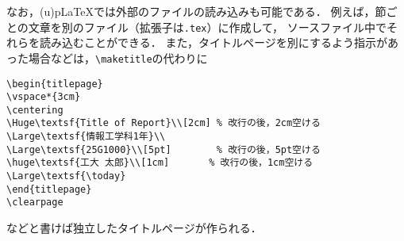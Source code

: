 なお，(u){p\LaTeX}では外部のファイルの読み込みも可能である．
例えば，節ごとの文章を別のファイル（拡張子は\texttt{.tex}）に作成して，
ソースファイル中でそれらを読み込むことができる．
また，タイトルページを別にするよう指示があった場合などは，\verb|\maketitle|の代わりに
\begin{tcolorbox}[colback=blue!5!white,colframe=blue!70!black,breakable=true]
\begin{lstlisting}
\begin{titlepage}
\vspace*{3cm}
\centering
\Huge\textsf{Title of Report}\\[2cm] % 改行の後，2cm空ける
\Large\textsf{情報工学科1年}\\
\Large\textsf{25G1000}\\[5pt]        % 改行の後，5pt空ける
\huge\textsf{工大 太郎}\\[1cm]       % 改行の後，1cm空ける
\Large\textsf{\today}
\end{titlepage}
\clearpage
\end{lstlisting}
\end{tcolorbox}
\noindent
などと書けば独立したタイトルページが作られる．
